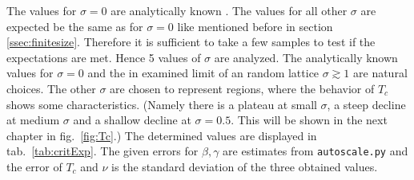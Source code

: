     The values for
    \(\sigma = 0\) are analytically known \cite{Pelissetto2002}. The
    values for all other \(\sigma\) are expected be the same as for
    \(\sigma = 0\) like mentioned before in section \ref{ssec:finitesize}.
    Therefore it is sufficient to take a few samples to test if the
    expectations are met. Hence 5 values of \(\sigma\) are analyzed.
    The analytically known values for \(\sigma = 0\) and the in \cite{Janke1994}
    examined limit of an random lattice \(\sigma \gtrsim 1\) are natural
    choices.
    The other \(\sigma\) are chosen to represent regions, where the behavior of
    \(T_c\) shows some characteristics. (Namely there is a plateau at small
    \(\sigma\), a steep decline at medium \(\sigma\) and a shallow
    decline at \(\sigma = 0.5\). This will be shown in the next
    chapter in fig.\ \ref{fig:Tc}.)
    The determined values are displayed in tab.\ \ref{tab:critExp}.
    The given errors for \(\beta, \gamma\) are estimates from \texttt{autoscale.py}
    and the error of \(T_c\) and \(\nu\) is the standard deviation of the
    three obtained values.\\
